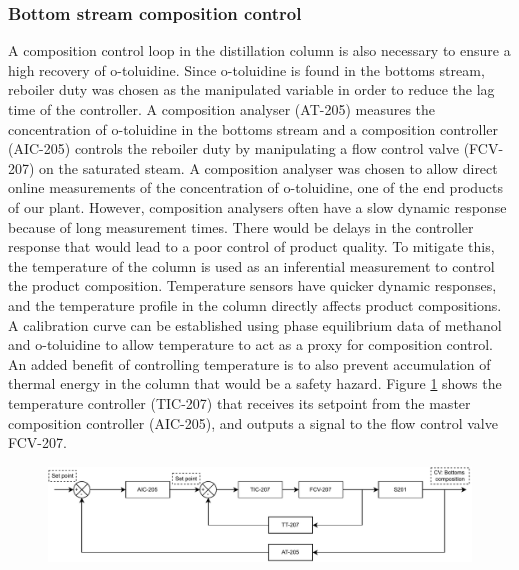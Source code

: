 \subsubsection{Bottom stream composition control} %
A composition control loop in the distillation column is also necessary to ensure a high recovery of o-toluidine. Since o-toluidine is found in the bottoms stream, reboiler duty was chosen as the manipulated variable in order to reduce the lag time of the controller. A composition analyser (AT-205) measures the concentration of o-toluidine in the bottoms stream and a composition controller (AIC-205) controls the reboiler duty by manipulating a flow control valve (FCV-207) on the saturated steam. 
A composition analyser was chosen to allow direct online measurements of the concentration of o-toluidine, one of the end products of our plant. However, composition analysers often have a slow dynamic response because of long measurement times. There would be delays in the controller response that would lead to a poor control of product quality. To mitigate this, the temperature of the column is used as an inferential measurement to control the product composition. Temperature sensors have quicker dynamic responses, and the temperature profile in the column directly affects product compositions. A calibration curve can be established using phase equilibrium data of methanol and o-toluidine to allow temperature to act as a proxy for composition control. An added benefit of controlling temperature is to also prevent accumulation of thermal energy in the column that would be a safety hazard. Figure \ref{fig:S201-CC} shows the temperature controller (TIC-207) that receives its setpoint from the master composition controller (AIC-205), and outputs a signal to the flow control valve FCV-207.

\begin{figure}[H]
    \centering
    \includegraphics[width=0.8\linewidth]{chapters/4-operation-control/4-Figures/S201-CC.pdf}
    \caption{}
    \label{fig:S201-CC}
\end{figure}


